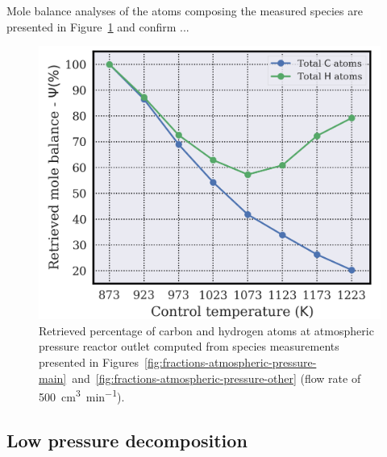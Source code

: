 \documentclass[final,3p,times,twocolumn,sort&compress]{elsarticle}
\begin{document}

Mole balance analyses of the atoms composing the measured species are presented in Figure~\ref{fig:balance-atmospheric-pressure} and confirm ...

\begin{figure}[h]
	\centering
	\includegraphics[width=\linewidth]
	{reworking/balance_atmospheric_pressure}
	\caption{\label{fig:balance-atmospheric-pressure}Retrieved percentage of carbon and hydrogen atoms at atmospheric pressure reactor outlet computed from species measurements presented in Figures~\ref{fig:fractions-atmospheric-pressure-main}~and~\ref{fig:fractions-atmospheric-pressure-other} (flow rate of \SI{500}{\cubic\centi\metre\per\minute}).}
\end{figure}

%

\subsection{Low pressure decomposition}
\end{document}

